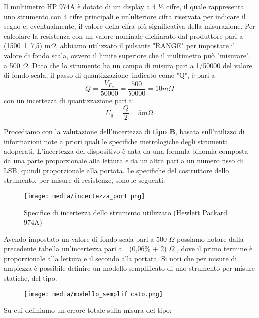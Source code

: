 Il multimetro HP 974A è dotato di un display a 4 ½ cifre, il quale rappresenta uno strumento con 4 cifre principali e un'ulteriore cifra riservata per indicare il segno e, eventualmente, il valore della cifra più significativa della misurazione. Per calcolare la resistenza con un valore nominale dichiarato dal produttore pari a (1500 ± 7,5) m$\Omega$, abbiamo utilizzato il pulsante "RANGE" per impostare il valore di fondo scala, ovvero il limite superiore che il multimetro può "misurare", a 500 $\Omega$. Dato che lo strumento ha un campo di misura pari a 1/50000 del valore di fondo scala, il passo di quantizzazione, indicato come "Q", è pari a
\begin{equation}
    Q = \frac{V_{F_S}}{50000} = \frac{500}{50000} = 10 m\Omega
\end{equation}
con un incertezza di quantizzazione pari a: 
\begin{equation}
    U_q = \frac{Q}{2} = 5 m\Omega
\end{equation}

Procediamo con la valutazione dell'incertezza di \textbf{tipo B}, basata sull'utilizzo di informazioni note a priori quali le specifiche metrologiche degli strumenti adoperati. L’incertezza del dispositivo è data da una formula binomia composta da una parte proporzionale alla lettura e da un’altra pari a un numero fisso di LSB, quindi 
 proporzionale alla portata. Le specifiche del costruttore dello strumento, per misure di resistenze, sono le seguenti:

\begin{figure} [h]
    \centering
    \texttt{[image: media/incertezza\_port.png]}
    \caption{Specifice di incertezza dello strumento utilizzato (Hewlett Packard 974A)}
    \label{fig:Incertezza_multimetro_port}
\end{figure}

Avendo impostato un valore di fondo scala pari a 500 $\Omega$ possiamo notare dalla precedente tabella un’incertezza pari a ±(0,06\% + 2) $\Omega$ , dove il primo termine è proporzionale alla lettura e il secondo alla portata. Si noti che per misure di ampiezza è possibile definire un modello semplificato di uno strumento per misure statiche, del tipo:

\begin{figure} [h]
    \centering
    \texttt{[image: media/modello\_semplificato.png]}
    \label{fig:modello}
\end{figure}

Su cui definiamo un errore totale sulla misura del tipo:

